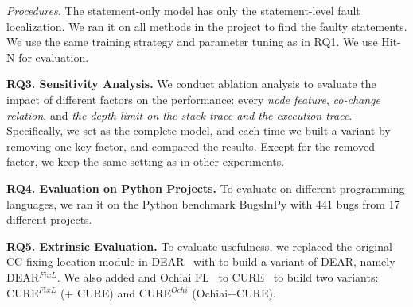 

\vspace{1pt}
\emph{Procedures.}
The statement-only model has only the statement-level fault
localization. We ran it on all methods in the project to find the
faulty statements. We use the same training strategy and parameter
tuning as in RQ1.
We use Hit-N for evaluation.

\vspace{2pt}
{\bf RQ3. Sensitivity Analysis.}  We conduct ablation analysis to
evaluate the impact of different factors on the performance: every
{\em node feature}, {\em co-change relation}, and {\em the depth limit
on the stack trace and the execution trace}. Specifically, we set
{\tool} as the complete model, and each time we built a variant by
removing one key factor, and compared the results.
Except for the removed factor, we keep the same setting
as in other experiments.

\vspace{2pt}
{\bf RQ4. Evaluation on Python Projects.}
%
To evaluate {\tool} on different programming languages, we ran it on the Python benchmark BugsInPy \cite{BugsInPy,widyasari2020bugsinpy} with 441 bugs from 17 different projects.



\vspace{2pt}
{\bf RQ5. Extrinsic Evaluation.} To evaluate usefulness, we replaced
the original CC fixing-location module in DEAR~\cite{icse22} with
{\tool} to build a variant of DEAR, namely DEAR$^{FixL}$.  We also
added {\tool} and Ochiai FL~\cite{Ochiai} to CURE~\cite{cure-icse21}
to build two variants: CURE$^{FixL}$ (\tool + CURE) and CURE$^{Ochi}$
(Ochiai+CURE).



